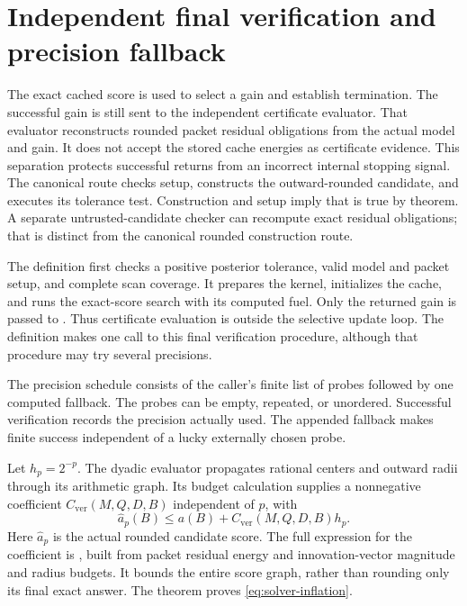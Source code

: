 \section{Independent final verification and precision fallback}
\label{sec:solver-verification}

The exact cached score is used to select a gain and establish termination. The
successful gain is still sent to the independent certificate evaluator. That
evaluator reconstructs rounded packet residual obligations from the actual model
and gain. It does not accept the stored cache energies as certificate evidence.
This separation protects successful returns from an incorrect internal stopping
signal. The canonical route checks setup, constructs the outward-rounded
candidate, and executes its tolerance test. Construction and setup imply that
 is true by theorem. A separate untrusted-candidate checker
can recompute exact residual obligations; that is distinct from the canonical
rounded construction route.

The definition  first checks a positive posterior tolerance,
valid model and packet setup, and complete scan coverage. It prepares the kernel,
initializes the cache, and runs the exact-score search with its computed fuel.
Only the returned gain is passed to . Thus certificate evaluation
is outside the selective update loop. The definition makes one call to this final
verification procedure, although that procedure may try several precisions.

The precision schedule consists of the caller's finite list of probes followed by
one computed fallback. The probes can be empty, repeated, or unordered. Successful
verification records the precision actually used. The appended fallback makes
finite success independent of a lucky externally chosen probe.

Let $h_p=2^{-p}$. The dyadic evaluator propagates rational centers and outward
radii through its arithmetic graph. Its budget calculation supplies a nonnegative
coefficient $C_{\mathrm{ver}}(M,Q,D,B)$ independent of $p$, with
\begin{equation}
 \widehat a_p(B)\le a(B)+C_{\mathrm{ver}}(M,Q,D,B)h_p.
 \label{eq:solver-inflation}
\end{equation}
Here $\widehat a_p$ is the actual rounded candidate score. The full expression for
the coefficient is , built from packet residual energy and
innovation-vector magnitude and radius budgets. It bounds the entire score graph,
rather than rounding only its final exact answer. The theorem
 proves \eqref{eq:solver-inflation}.

